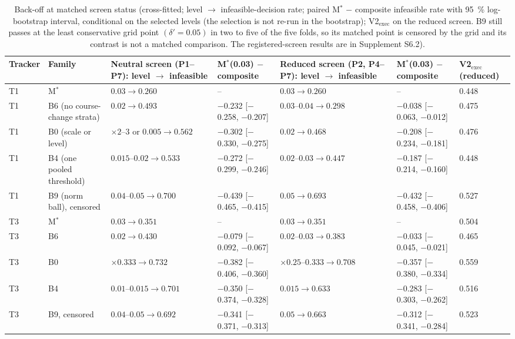 \documentclass{ieeeaccess}
\begin{document}
\begin{table}[!t]
\centering
\caption{Back-off at matched screen status (cross-fitted; level $\to$ infeasible-decision rate; paired M$^{*}$ $-$ composite infeasible rate with 95~\% log-bootstrap interval, conditional on the selected levels (the selection is not re-run in the bootstrap); V2$_{\mathrm{exec}}$ on the reduced screen. \dag{} B9 still passes at the least conservative grid point $(\delta' = 0.05)$ in two to five of the five folds, so its matched point is censored by the grid and its contrast is not a matched comparison. The registered-screen results are in Supplement S6.2).}
\label{tab:6}
\footnotesize
\setlength{\tabcolsep}{3pt}
\renewcommand{\arraystretch}{1.15}
\begin{tabular}{@{}L{0.060\textwidth}L{0.184\textwidth}L{0.155\textwidth}L{0.155\textwidth}L{0.147\textwidth}L{0.155\textwidth}L{0.067\textwidth}@{}}
\hline
Tracker & Family & Neutral screen (P1--P7): level $\to$ infeasible & M$^{*}$(0.03) $-$ composite & Reduced screen (P2, P4--P7): level $\to$ infeasible & M$^{*}$(0.03) $-$ composite & V2$_{\mathrm{exec}}$ (reduced) \\
\hline
T1 & M$^{*}$ & $0.03 \to 0.260$ & -- & $0.03 \to 0.260$ & -- & 0.448 \\
T1 & B6 (no course-change strata) & $0.02 \to 0.493$ & $-$0.232 [$-$0.258, $-$0.207] & $0.03\text{--}0.04 \to 0.298$ & $-$0.038 [$-$0.063, $-$0.012] & 0.475 \\
T1 & B0 (scale or level) & $\times2\text{--}3$ or $0.005 \to 0.562$ & $-$0.302 [$-$0.330, $-$0.275] & $0.02 \to 0.468$ & $-$0.208 [$-$0.234, $-$0.181] & 0.476 \\
T1 & B4 (one pooled threshold) & $0.015\text{--}0.02 \to 0.533$ & $-$0.272 [$-$0.299, $-$0.246] & $0.02\text{--}0.03 \to 0.447$ & $-$0.187 [$-$0.214, $-$0.160] & 0.448 \\
T1 & B9 (norm ball), censored\dag{} & $0.04\text{--}0.05 \to 0.700$ & $-$0.439 [$-$0.465, $-$0.415] & $0.05 \to 0.693$ & $-$0.432 [$-$0.458, $-$0.406] & 0.527 \\
T3 & M$^{*}$ & $0.03 \to 0.351$ & -- & $0.03 \to 0.351$ & -- & 0.504 \\
T3 & B6 & $0.02 \to 0.430$ & $-$0.079 [$-$0.092, $-$0.067] & $0.02\text{--}0.03 \to 0.383$ & $-$0.033 [$-$0.045, $-$0.021] & 0.465 \\
T3 & B0 & $\times0.333 \to 0.732$ & $-$0.382 [$-$0.406, $-$0.360] & $\times0.25\text{--}0.333 \to 0.708$ & $-$0.357 [$-$0.380, $-$0.334] & 0.559 \\
T3 & B4 & $0.01\text{--}0.015 \to 0.701$ & $-$0.350 [$-$0.374, $-$0.328] & $0.015 \to 0.633$ & $-$0.283 [$-$0.303, $-$0.262] & 0.516 \\
T3 & B9, censored\dag{} & $0.04\text{--}0.05 \to 0.692$ & $-$0.341 [$-$0.371, $-$0.313] & $0.05 \to 0.663$ & $-$0.312 [$-$0.341, $-$0.284] & 0.523 \\
\hline
\end{tabular}
\end{table}
\end{document}
